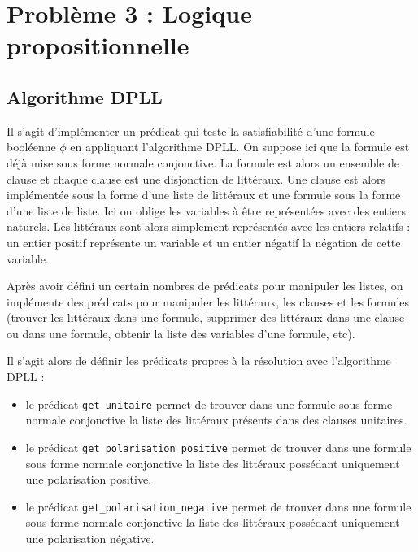 \documentclass[12pt,a4paper]{article}
\begin{document}
\section{Problème 3 : Logique propositionnelle}
\subsection{Algorithme DPLL}
Il s'agit d'implémenter un prédicat qui teste la satisfiabilité d'une formule booléenne $\phi$ en appliquant l'algorithme DPLL. On suppose ici que la formule est déjà mise sous forme normale conjonctive. La formule est alors un ensemble de clause et chaque clause est une disjonction de littéraux.  Une clause est alors implémentée sous la forme d'une liste de littéraux et une formule sous la forme d'une liste de liste. Ici on oblige les variables à être représentées avec des entiers naturels. Les littéraux sont alors simplement représentés avec les entiers relatifs : un entier positif représente un variable et un entier négatif la négation de cette variable.

Après avoir défini un certain nombres de prédicats pour manipuler les listes, on implémente des prédicats pour manipuler les littéraux, les clauses et les formules (trouver les littéraux dans une formule, supprimer des littéraux dans une clause ou dans une formule, obtenir la liste des variables d'une formule, etc).

Il s'agit alors de définir les prédicats propres à la résolution avec l'algorithme DPLL :
\begin{itemize}
\item le prédicat \texttt{get\_unitaire} permet de trouver dans une formule sous forme normale conjonctive la liste des littéraux présents dans des clauses unitaires.
\item le prédicat \texttt{get\_polarisation\_positive} permet de trouver dans une formule sous forme normale conjonctive la liste des littéraux possédant uniquement une polarisation positive.
\item le prédicat \texttt{get\_polarisation\_negative} permet de trouver dans une formule sous forme normale conjonctive la liste des littéraux possédant uniquement une polarisation négative.
\end{itemize}
\end{document}
